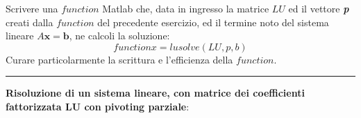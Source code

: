 Scrivere una $function$ Matlab che, data in ingresso la matrice $LU$ ed il vettore \textit{\textbf{p}} creati dalla $function$ del precedente esercizio, ed il termine noto del sistema lineare $A\textbf{x} = \textbf{b}$, ne calcoli la soluzione:
$$function x = lusolve(LU,p,b)$$
Curare particolarmente la scrittura e l’efficienza della $function$.

\hspace*{\fill}
\par\noindent\rule{\textwidth}{0.4pt}
\hspace*{\fill}

\begin{minipage}{\textwidth}
    \textbf{Risoluzione di un sistema lineare, con matrice dei coefficienti fattorizzata LU con pivoting parziale}:
    
\end{minipage}
